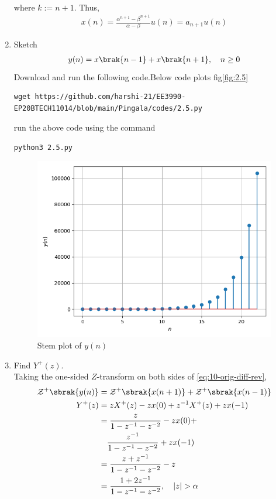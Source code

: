 \documentclass[journal,12pt,twocolumn]{IEEEtran}
\renewcommand\thesection{\arabic{section}}
\begin{document}
\begin{enumerate}[label=\thesection.\arabic*,ref=\thesection.\theenumi]
\begin{align}
\end{align}
where $k := n + 1$. Thus,
\begin{align}
    x(n) = \frac{\alpha^{n + 1} - \beta^{n + 1}}{\alpha - \beta}u(n) = a_{n + 1}u(n)
    \label{eq:x-n-def}
\end{align}
\item Sketch 
\begin{align}
y(n) = x\brak{n-1} + x\brak{n+1},  \quad n \ge 0
\label{eq:10-orig-diff-rev}
\end{align}
\solution Download and run the following code.Below code plots fig\eqref{fig:2.5}
\begin{lstlisting}
wget https://github.com/harshi-21/EE3990-EP20BTECH11014/blob/main/Pingala/codes/2.5.py
\end{lstlisting}
run the above code using the command
\begin{lstlisting}
python3 2.5.py
\end{lstlisting}
\begin{figure}[h]
    \centering
    \includegraphics[width=\columnwidth]{./figs/2.5.png}
    \caption{Stem plot of $y(n)$}
    \label{fig:2.5}
\end{figure}


	\item Find $Y^{+}(z)$. \\
	\solution Taking the one-sided $Z$-transform on both sides of \eqref{eq:10-orig-diff-rev},
\begin{align}
\mathcal{Z}^+\sbrak{y(n)} &= \mathcal{Z}^+\sbrak{x(n + 1)} + \mathcal{Z}^+\sbrak{x(n - 1)} \\
Y^+(z) &= zX^+(z) - zx(0) + z^{-1}X^+(z) + zx(-1) \\
&= \frac{z}{1 - z^{-1} - z^{-2}} - zx(0) + \nonumber\\
&\quad \frac{z^{-1}}{1 - z^{-1} - z^{-2}} + zx(-1) \\
&= \frac{z + z^{-1}}{1 - z^{-1} - z^{-2}} - z \\
&= \frac{1 + 2z^{-1}}{1 - z^{-1} - z^{-2}}, \quad |z| > \alpha
\end{align}


\end{enumerate}
\end{document}
